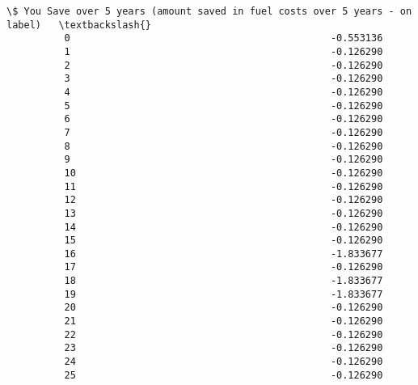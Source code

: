 \documentclass[11pt]{article}
\begin{document}
\begin{Verbatim}[commandchars=\\\{\}]
                \$ You Save over 5 years (amount saved in fuel costs over 5 years - on label)   \textbackslash{}
          0                                             -0.553136                               
          1                                             -0.126290                               
          2                                             -0.126290                               
          3                                             -0.126290                               
          4                                             -0.126290                               
          5                                             -0.126290                               
          6                                             -0.126290                               
          7                                             -0.126290                               
          8                                             -0.126290                               
          9                                             -0.126290                               
          10                                            -0.126290                               
          11                                            -0.126290                               
          12                                            -0.126290                               
          13                                            -0.126290                               
          14                                            -0.126290                               
          15                                            -0.126290                               
          16                                            -1.833677                               
          17                                            -0.126290                               
          18                                            -1.833677                               
          19                                            -1.833677                               
          20                                            -0.126290                               
          21                                            -0.126290                               
          22                                            -0.126290                               
          23                                            -0.126290                               
          24                                            -0.126290                               
          25                                            -0.126290                               

\end{Verbatim}
\end{document}
